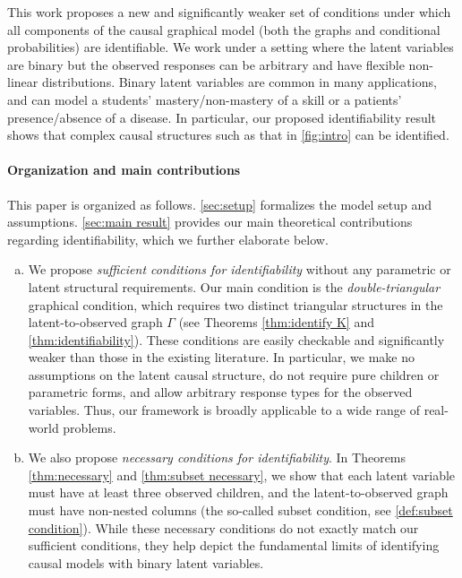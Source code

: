 \documentclass[10pt]{article} %
\begin{document}
This work proposes a new and significantly weaker set of conditions under which all components of the causal graphical model (both the graphs and conditional probabilities) are identifiable. We work under a setting where the latent variables are binary but the observed responses can be arbitrary and have flexible non-linear distributions. Binary latent variables are common in many applications, and can model a students' mastery/non-mastery of a skill or a patients' presence/absence of a disease. In particular, our proposed identifiability result shows that complex causal structures such as that in \cref{fig:intro} can be identified.
%

%
%
%

\paragraph{Organization and main contributions}
This paper is organized as follows. \cref{sec:setup} formalizes the model setup and assumptions. \cref{sec:main result} provides our main theoretical contributions regarding identifiability, which we further elaborate below.
\begin{enumerate}[(a)]
    \item We propose \emph{sufficient conditions for identifiability} without any parametric or latent structural requirements. Our main condition is the \emph{double-triangular} graphical condition, which requires two distinct triangular structures in the latent-to-observed graph $\Gamma$ (see Theorems \ref{thm:identify K} and \ref{thm:identifiability}). These conditions are easily checkable and significantly weaker than those in the existing literature. In particular, we make no assumptions on the latent causal structure, do not require pure children or parametric forms, and allow arbitrary response types for the observed variables. Thus, our framework is broadly applicable to a wide range of real-world problems.
%
    
    \item We also propose \emph{necessary conditions for identifiability}. In Theorems \ref{thm:necessary} and \ref{thm:subset necessary}, we show that each latent variable must have at least three observed children, and the latent-to-observed graph must have non-nested columns (the so-called subset condition, see \cref{def:subset condition}). While these necessary conditions do not exactly match our sufficient conditions, they help depict the fundamental limits of identifying causal models with binary latent variables.
\end{enumerate}
\end{document}
